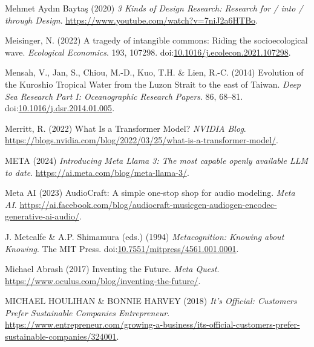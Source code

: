 \documentclass[
  letterpaper,
  DIV=11,
  numbers=noendperiod]{scrartcl}
\newlength{\cslhangindent}
\newenvironment{CSLReferences}[2] %
 {\begin{list}{}{%
  \setlength{\itemindent}{0pt}
  \setlength{\leftmargin}{0pt}
  \setlength{\parsep}{0pt}
  \ifodd #1
   \setlength{\leftmargin}{\cslhangindent}
   \setlength{\itemindent}{-1\cslhangindent}
  \fi
  \setlength{\itemsep}{#2\baselineskip}}}
 {\end{list}}
\begin{document}
\begin{CSLReferences}{0}{1}
Mehmet Aydın Baytaş (2020) \emph{3 {Kinds} of {Design Research}:
{Research} for / into / through {Design}}.
\url{https://www.youtube.com/watch?v=7niJ2a6HTBo}.

Meisinger, N. (2022) A tragedy of intangible commons: {Riding} the
socioecological wave. \emph{Ecological Economics}. 193, 107298.
doi:\href{https://doi.org/10.1016/j.ecolecon.2021.107298}{10.1016/j.ecolecon.2021.107298}.

Mensah, V., Jan, S., Chiou, M.-D., Kuo, T.H. \& Lien, R.-C. (2014)
Evolution of the {Kuroshio Tropical Water} from the {Luzon Strait} to
the east of {Taiwan}. \emph{Deep Sea Research Part I: Oceanographic
Research Papers}. 86, 68--81.
doi:\href{https://doi.org/10.1016/j.dsr.2014.01.005}{10.1016/j.dsr.2014.01.005}.

Merritt, R. (2022) What {Is} a {Transformer Model}? \emph{NVIDIA Blog}.
\url{https://blogs.nvidia.com/blog/2022/03/25/what-is-a-transformer-model/}.

META (2024) \emph{Introducing {Meta Llama} 3: {The} most capable openly
available {LLM} to date}. \url{https://ai.meta.com/blog/meta-llama-3/}.

Meta AI (2023) {AudioCraft}: {A} simple one-stop shop for audio
modeling. \emph{Meta AI}.
\url{https://ai.facebook.com/blog/audiocraft-musicgen-audiogen-encodec-generative-ai-audio/}.

J. Metcalfe \& A.P. Shimamura (eds.) (1994) \emph{Metacognition:
{Knowing} about {Knowing}}. The MIT Press.
doi:\href{https://doi.org/10.7551/mitpress/4561.001.0001}{10.7551/mitpress/4561.001.0001}.

Michael Abrash (2017) Inventing the {Future}. \emph{Meta Quest}.
\url{https://www.oculus.com/blog/inventing-the-future/}.

MICHAEL HOULIHAN \& BONNIE HARVEY (2018) \emph{It's {Official}:
{Customers Prefer Sustainable Companies} {\textbar} {Entrepreneur}}.
\url{https://www.entrepreneur.com/growing-a-business/its-official-customers-prefer-sustainable-companies/324001}.


\end{CSLReferences}
\end{document}
